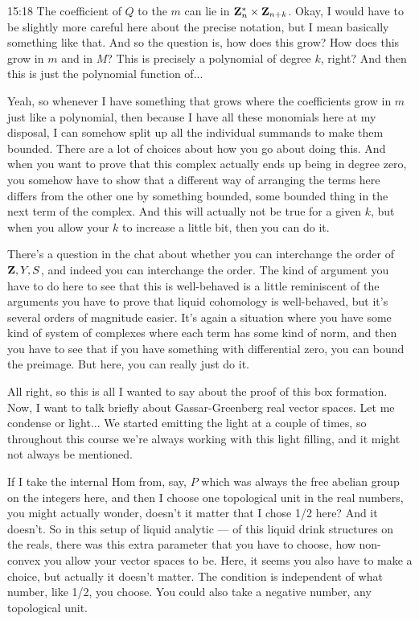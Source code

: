 \begin{unfinished}{15:18}
The coefficient of $Q$ to the $m$ can lie in $\mathbf Z_n^* \times \mathbf Z_{n+k}$. Okay, I would have to be slightly more careful here about the precise notation, but I mean basically something like that. And so the question is, how does this grow? How does this grow in $m$ and in $M$? This is precisely a polynomial of degree $k$, right? And then this is just the polynomial function of...

Yeah, so whenever I have something that grows where the coefficients grow in $m$ just like a polynomial, then because I have all these monomials here at my disposal, I can somehow split up all the individual summands to make them bounded. There are a lot of choices about how you go about doing this. And when you want to prove that this complex actually ends up being in degree zero, you somehow have to show that a different way of arranging the terms here differs from the other one by something bounded, some bounded thing in the next term of the complex. And this will actually not be true for a given $k$, but when you allow your $k$ to increase a little bit, then you can do it.

There's a question in the chat about whether you can interchange the order of $\mathbf Z , Y ,S$, and indeed you can interchange the order. The kind of argument you have to do here to see that this is well-behaved is a little reminiscent of the arguments you have to prove that liquid cohomology is well-behaved, but it's several orders of magnitude easier. It's again a situation where you have some kind of system of complexes where each term has some kind of norm, and then you have to see that if you have something with differential zero, you can bound the preimage. But here, you can really just do it.

All right, so this is all I wanted to say about the proof of this box formation. Now, I want to talk briefly about Gassar-Greenberg real vector spaces. Let me condense or light... We started emitting the light at a couple of times, so throughout this course we're always working with this light filling, and it might not always be mentioned.

If I take the internal Hom from, say, $P$ which was always the free abelian group on the integers here, and then I choose one topological unit in the real numbers, you might actually wonder, doesn't it matter that I chose 1/2 here? And it doesn't. So in this setup of liquid analytic --- of this liquid drink structures on the reals, there was this extra parameter that you have to choose, how non-convex you allow your vector spaces to be. Here, it seems you also have to make a choice, but actually it doesn't matter. The condition is independent of what number, like 1/2, you choose. You could also take a negative number, any topological unit.


\end{unfinished}
